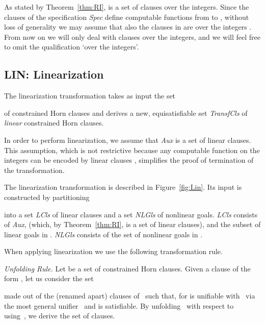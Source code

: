 \documentclass[english]{tlp}
\begin{document}
As stated by Theorem~\ref{thm:RI},  is a set of
clauses over the integers. Since the clauses of the specification {\it Spec} define
computable functions from  to , without loss of generality we may assume that also
the clauses in  are over the integers \cite{SeS82}.
From now on we will only deal with clauses over the integers, and
we will feel free to omit the qualification `over the integers'.


\subsection{{\bf{LIN:}} Linearization}
\label{subsec:linearization}


The {\rm linearization} transformation takes as input the set 

of constrained Horn clauses and derives a new, equisatisfiable set \textit{TransfCls} of 
{\it linear} constrained Horn clauses. 

In order to perform linearization, we assume that
\textit{Aux} is a set of linear clauses.
This assumption,
which is not restrictive because any computable function on the integers can be
encoded by linear clauses \cite{SeS82}, simplifies the 
proof of termination of the transformation.

The {\rm linearization} transformation is described in Figure~\ref{fig:Lin}.
Its input is constructed  by partitioning

into a set {\it LCls} of linear clauses and a set {\it NLGls} of nonlinear goals.
{\it LCls} consists of \textit{Aux},  
(which, by Theorem~\ref{thm:RI}, is a set of linear clauses),
and the subset of linear goals in . 
{\it NLGls} consists of the set of nonlinear goals in .


When applying linearization we use the following transformation rule.

\smallskip
\noindent
{\it Unfolding  Rule.} Let  be a set of constrained Horn clauses.
Given a clause  
of the form , 
let us consider the set
 
made out of the (renamed apart) clauses of~ 
such that, for  
 is unifiable with~ via the most general 
unifier~ and  is satisfiable. 
By unfolding~ with respect to~ using~, we derive the set 
 of clauses.
\end{document}
